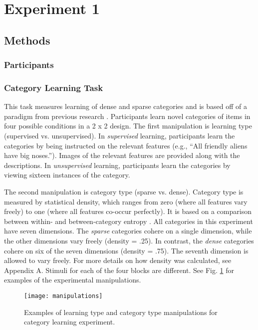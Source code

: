 \documentclass[../dissertation.tex]{subfiles}
\begin{document}
\section{Experiment 1}

\subsection{Methods}
\subsubsection{Participants}
\subsubsection{Category Learning Task}
	This task measures learning of dense and sparse categories and is based off of a paradigm from previous research \citep{Kloos2008}. Participants learn novel categories of items in four possible conditions in a 2 x 2 design. The first manipulation is learning type (supervised vs. unsupervised). In \textit{supervised} learning, participants learn the categories by being instructed on the relevant features (e.g., “All friendly aliens have big noses.”). Images of the relevant features are provided along with the descriptions. In \textit{unsupervised} learning, participants learn the categories by viewing sixteen instances of the category. \par
	The second manipulation is category type (sparse vs. dense). Category type is measured by statistical density, which ranges from zero (where all features vary freely) to one (where all features co-occur perfectly). It is based on a comparison between within- and between-category entropy \citep{Sloutsky2010}. All categories in this experiment have seven dimensions. The \textit{sparse} categories cohere on a single dimension, while the other dimensions vary freely (density = .25). In contrast, the \textit{dense} categories cohere on six of the seven dimensions (density = .75). The seventh dimension is allowed to vary freely. For more details on how density was calculated, see Appendix A. Stimuli for each of the four blocks are different. See Fig. \ref{sloutskymanip} for examples of the experimental manipulations. \par
\begin{figure}[htp]
\texttt{[image: manipulations]}
\caption{Examples of learning type and category type manipulations for category learning experiment.}
\vspace{-10pt}
\label{sloutskymanip}
\end{figure}
\end{document}
